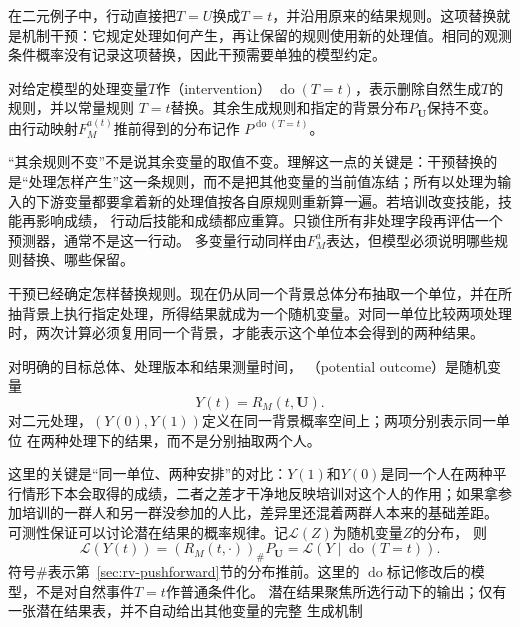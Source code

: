 在二元例子中，行动直接把\(T=U\)换成\(T=t\)，并沿用原来的结果规则。这项替换就是机制干预：它规定处理如何产生，再让保留的规则使用新的处理值。相同的观测条件概率没有记录这项替换，因此干预需要单独的模型约定。

\begin{definition}[理想干预]
  \label{def:causal-intervention}
  对给定模型的处理变量\(T\)作（intervention）
  \(\operatorname{do}(T=t)\)，表示删除自然生成\(T\)的规则，并以常量规则
  \(T=t\)替换。其余生成规则和指定的背景分布\(P_{\bm U}\)保持不变。
  由行动映射\(F_M^{a(t)}\)推前得到的分布记作
  \(P^{\operatorname{do}(T=t)}\)。
\end{definition}

“其余规则不变”不是说其余变量的取值不变。理解这一点的关键是：干预替换的是“处理怎样产生”这一条规则，而不是把其他变量的当前值冻结；所有以处理为输入的下游变量都要拿着新的处理值按各自原规则重新算一遍。若培训改变技能，技能再影响成绩，
行动后技能和成绩都应重算。只锁住所有非处理字段再评估一个预测器，通常不是这一行动。
多变量行动同样由\(F_M^a\)表达，但模型必须说明哪些规则替换、哪些保留。

干预已经确定怎样替换规则。现在仍从同一个背景总体分布抽取一个单位，并在所抽背景上执行指定处理，所得结果就成为一个随机变量。对同一单位比较两项处理时，两次计算必须复用同一个背景，才能表示这个单位本会得到的两种结果。
\begin{definition}[潜在结果]
  \label{def:causal-potential-outcomes}
  对明确的目标总体、处理版本和结果测量时间，
  （potential outcome）是随机变量
  \begin{equation}
    Y(t)=R_M(t,\bm U).
    \label{eq:causal-response-potential-outcome}
  \end{equation}
  对二元处理，\((Y(0),Y(1))\)定义在同一背景概率空间上；两项分别表示同一单位
  在两种处理下的结果，而不是分别抽取两个人。
\end{definition}

这里的关键是“同一单位、两种安排”的对比：\(Y(1)\)和\(Y(0)\)是同一个人在两种平行情形下本会取得的成绩，二者之差才干净地反映培训对这个人的作用；如果拿参加培训的一群人和另一群没参加的人比，差异里还混着两群人本来的基础差距。
可测性保证可以讨论潜在结果的概率规律。记\(\mathcal L(Z)\)为随机变量\(Z\)的分布，
则
\[
  \mathcal L(Y(t))
  =
  (R_M(t,\cdot))_{\#}P_{\bm U}
  =
  \mathcal L(Y\mid\operatorname{do}(T=t)).
\]
符号\(\#\)表示第~\ref{sec:rv-pushforward}节的分布推前。这里的
\(\operatorname{do}\)标记修改后的模型，不是对自然事件\(T=t\)作普通条件化。
潜在结果聚焦所选行动下的输出；仅有一张潜在结果表，并不自动给出其他变量的完整
生成机制

